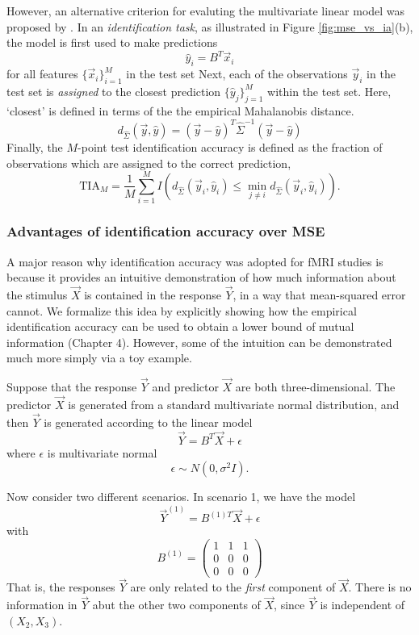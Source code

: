 However, an alternative criterion for evaluting the multivariate
linear model was proposed by \cite{Kay2008a}.  In an
\emph{identification task}\cite{Kay2008a}, as illustrated in Figure
\ref{fig:mse_vs_ia}(b), the model is first used to make predictions
\[
\hat{y}_i = B^T \vec{x}_i
\]
for all features $\{\vec{x}_i\}_{i=1}^M$ in the test set Next, each of the
observations $\vec{y}_i$ in the test set is \emph{assigned} to the
closest prediction $\{\hat{y}_j\}_{j=1}^M$ within the test set.
Here, `closest' is defined in terms of the 
the empirical Mahalanobis distance.
\[
d_{\hat{\Sigma}}(\vec{y}, \hat{y}) = (\vec{y} - \hat{y})^T \hat{\Sigma}^{-1} (\vec{y}-\hat{y})
\]
Finally, the $M$-point test identification accuracy is defined as the fraction
of observations which are assigned to the correct prediction,
\[
\text{TIA}_M = \frac{1}{M}\sum_{i=1}^M I(d_{\hat{\Sigma}}(\vec{y}_i, \hat{y}_i) \leq \min_{j \neq i} d_{\hat{\Sigma}}(\vec{y}_i, \hat{y}_i)).
\]

\subsubsection{Advantages of identification accuracy over MSE}

A major reason why identification accuracy was adopted for fMRI
studies is because it provides an intuitive demonstration of how much
information about the stimulus $\vec{X}$ is contained in the response
$\vec{Y}$, in a way that mean-squared error cannot.  We formalize this
idea by explicitly showing how the empirical identification accuracy
can be used to obtain a lower bound of mutual information (Chapter 4).
However, some of the intuition can be demonstrated much more simply
via a toy example.

Suppose that the response $\vec{Y}$ and predictor $\vec{X}$ are both
three-dimensional.  The predictor $\vec{X}$ is generated from a standard
multivariate normal distribution, and then $\vec{Y}$ is generated
according to the linear model
\[
\vec{Y} = B^T \vec{X} + \epsilon
\]
where $\epsilon$ is multivariate normal
\[
\epsilon \sim N(0, \sigma^2 I).
\]

Now consider two different scenarios.  In scenario 1, we have
the model 
\[
\vec{Y}^{(1)} = B^{(1)T} \vec{X} + \epsilon
\]
with
\[
B^{(1)} = \begin{pmatrix}
1 & 1 & 1\\
0 & 0 & 0\\
0 & 0 & 0
\end{pmatrix}
\]
That is, the responses $\vec{Y}$ are only related to the \emph{first}
component of $\vec{X}$.  There is no information in $\vec{Y}$ abut the
other two components of $\vec{X}$, since $\vec{Y}$ is independent of
$(X_2, X_3)$.

